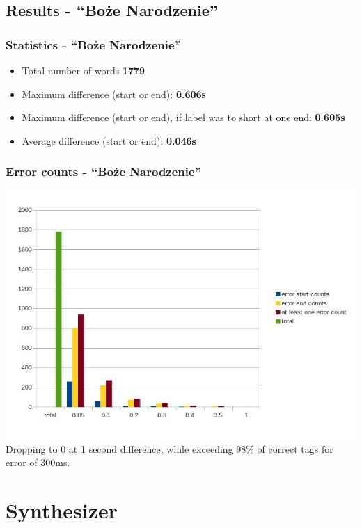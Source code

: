 \documentclass[]{beamer}
\begin{document}
\subsection{Results - “Boże Narodzenie”}
\begin{frame}
    \frametitle{Statistics - “Boże Narodzenie”}
    \begin{itemize}
        \item Total number of words				\textbf{1779}
        \item Maximum difference (start or end): 			\textbf{0.606s}
        \item Maximum difference (start or end), if label was to short at one end: 			\textbf{0.605s}
        \item Average difference  (start or end):			\textbf{0.046s}
    \end{itemize}
\end{frame}
\begin{frame}
    \frametitle{Error counts - “Boże Narodzenie”}
    \includegraphics[scale=0.37]{boze_narodzenie_length_based_counts.jpg}
    Dropping to 0 at 1 second difference, while exceeding 98\% of correct tags for error of 300ms.
\end{frame}

\section{Synthesizer}
\end{document}
